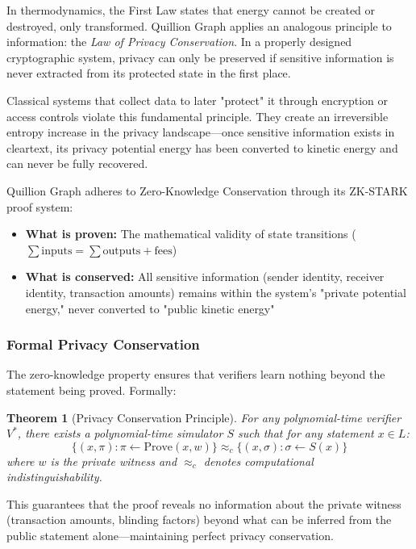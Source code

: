\documentclass[12pt,a4paper]{article}
\newtheorem{theorem}{Theorem}[section]
\begin{document}
In thermodynamics, the First Law states that energy cannot be created or destroyed, only transformed. Quillion Graph applies an analogous principle to information: the \textit{Law of Privacy Conservation}. In a properly designed cryptographic system, privacy can only be preserved if sensitive information is never extracted from its protected state in the first place.

Classical systems that collect data to later "protect" it through encryption or access controls violate this fundamental principle. They create an irreversible entropy increase in the privacy landscape—once sensitive information exists in cleartext, its privacy potential energy has been converted to kinetic energy and can never be fully recovered.

Quillion Graph adheres to Zero-Knowledge Conservation through its ZK-STARK proof system:

\begin{itemize}
    \item \textbf{What is proven:} The mathematical validity of state transitions ($\sum \text{inputs} = \sum \text{outputs} + \text{fees}$)
    \item \textbf{What is conserved:} All sensitive information (sender identity, receiver identity, transaction amounts) remains within the system's "private potential energy," never converted to "public kinetic energy"
\end{itemize}

\subsubsection{Formal Privacy Conservation}

The zero-knowledge property ensures that verifiers learn nothing beyond the statement being proved. Formally:

\begin{theorem}[Privacy Conservation Principle]
For any polynomial-time verifier $V^*$, there exists a polynomial-time simulator $S$ such that for any statement $x \in L$:
$$\{(x, \pi) : \pi \leftarrow \text{Prove}(x, w)\} \approx_c \{(x, \sigma) : \sigma \leftarrow S(x)\}$$
where $w$ is the private witness and $\approx_c$ denotes computational indistinguishability.
\end{theorem}

This guarantees that the proof reveals no information about the private witness (transaction amounts, blinding factors) beyond what can be inferred from the public statement alone—maintaining perfect privacy conservation.
\end{document}
